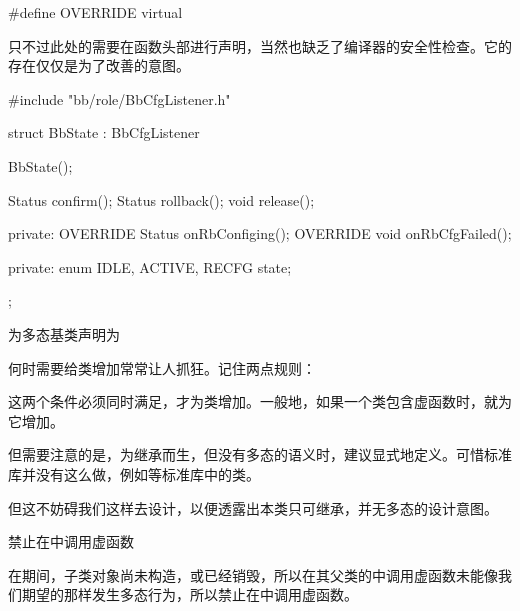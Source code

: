 \begin{content}
\begin{leftbar}
\begin{c++}
#define OVERRIDE virtual
\end{c++}
\end{leftbar}

只不过此处的需要在函数头部进行声明，当然也缺乏了编译器的安全性检查。它的存在仅仅是为了改善的意图。

\begin{leftbar}
\begin{c++}
#include "bb/role/BbCfgListener.h"

struct BbState : BbCfgListener
{
    BbState();    
   
    Status confirm();
    Status rollback();
    void   release();

private:
    OVERRIDE Status onRbConfiging(); 
    OVERRIDE void   onRbCfgFailed();

private:    
    enum{ IDLE, ACTIVE, RECFG } state;
};
\end{c++}
\end{leftbar}

\begin{regulation}
为多态基类声明为
\end{regulation}

何时需要给类增加常常让人抓狂。记住两点规则：

\begin{enum}
\end{enum}

这两个条件必须同时满足，才为类增加。一般地，如果一个类包含虚函数时，就为它增加。

但需要注意的是，为继承而生，但没有多态的语义时，建议显式地定义。可惜标准库并没有这么做，例如等标准库中的类。

但这不妨碍我们这样去设计，以便透露出本类只可继承，并无多态的设计意图。

\begin{regulation}
禁止在中调用虚函数
\end{regulation}

在期间，子类对象尚未构造，或已经销毁，所以在其父类的中调用虚函数未能像我们期望的那样发生多态行为，所以禁止在中调用虚函数。


\end{content}
